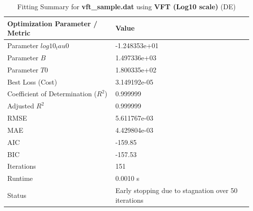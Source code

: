 \begin{table}[htbp]
\centering
\caption{Fitting Summary for \textbf{vft_sample.dat} using \textbf{VFT (Log10 scale)} (DE)}
\begin{tabular}{ll}
\hline\hline
\textbf{Optimization Parameter / Metric} & \textbf{Value} \\
\hline
Parameter $log10_tau0$ & -1.248353e+01 \\
Parameter $B$ & 1.497336e+03 \\
Parameter $T0$ & 1.800335e+02 \\
\hline
Best Loss (Cost) & 3.149192e-05 \\
Coefficient of Determination ($R^2$) & 0.999999 \\
Adjusted $R^2$ & 0.999999 \\
RMSE & 5.611767e-03 \\
MAE & 4.429804e-03 \\
AIC & -159.85 \\
BIC & -157.53 \\
\hline
Iterations & 151 \\
Runtime & 0.0010 s \\
Status & Early stopping due to stagnation over 50 iterations \\
\hline\hline
\end{tabular}
\label{tab:edibot_fit_vft_sample_dat}
\end{table}
